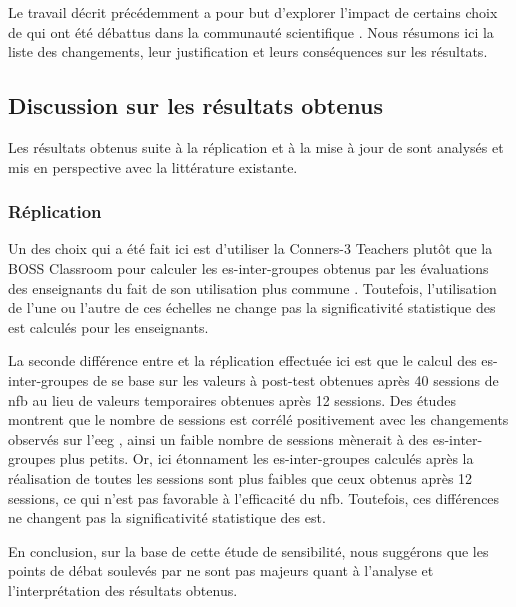 Le travail décrit précédemment a pour but d'explorer l'impact de certains choix de \citet{Cortese2016} qui ont été débattus dans la communauté scientifique 
\citep{Micoulaud2016}. Nous résumons ici la liste des changements, leur justification et leurs conséquences sur les résultats. 

\subsection{Discussion sur les résultats obtenus} \label{replication_and_update}

Les résultats obtenus suite à la réplication et à la mise à jour de \citet{Cortese2016} sont analysés et mis en perspective avec la littérature existante.

\subsubsection{Réplication}

Un des choix qui a été fait ici est d'utiliser la Conners-3 Teachers \citep{Conners2008} plutôt que la BOSS Classroom \citep{Shapiro2010} 
pour calculer les \gls{es}-inter-groupes obtenus par les évaluations des enseignants du fait de son utilisation plus commune \citep{Christiansen2014, Bluschke2016}.
Toutefois, l'utilisation de l'une ou l'autre de ces échelles ne change pas la significativité statistique des \gls{est} calculés pour les enseignants. 

La seconde différence entre \citep{Cortese2016} et la réplication effectuée ici est que le calcul des \gls{es}-inter-groupes de \citet{Arnold2014} se base 
sur les valeurs à post-test obtenues après 40 sessions de \gls{nfb} au lieu de valeurs temporaires obtenues après 12 sessions. Des études montrent
que le nombre de sessions est corrélé positivement avec les changements observés sur l'\gls{eeg} \citep{Vernon2004}, ainsi un faible nombre de sessions mènerait
à des \gls{es}-inter-groupes plus petits. Or, ici étonnament les \gls{es}-inter-groupes calculés après la réalisation de toutes les sessions sont plus faibles que ceux 
obtenus après 12 sessions, ce qui n'est pas favorable à l'efficacité du \gls{nfb}. Toutefois, ces différences ne changent pas la significativité statistique des \gls{est}. 

En conclusion, sur la base de cette étude de sensibilité, nous suggérons que les points de débat soulevés par \citet{Micoulaud2016} ne sont pas majeurs 
quant à l'analyse et l'interprétation des résultats obtenus.

